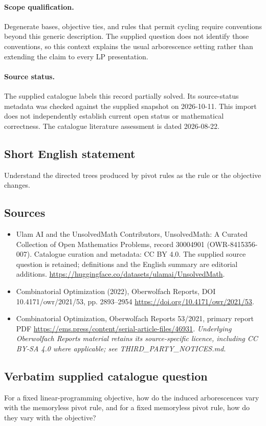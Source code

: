 \documentclass[11pt]{article}
\begin{document}
\paragraph{Scope qualification.}
Degenerate bases, objective ties, and rules that permit cycling require conventions beyond this generic description. The supplied question does not identify those conventions, so this context explains the usual arborescence setting rather than extending the claim to every LP presentation.
\paragraph{Source status.}
The supplied catalogue labels this record partially solved. Its source-status metadata was checked against the supplied snapshot on 2026-10-11. This import does not independently establish current open status or mathematical correctness. The catalogue literature assessment is dated 2026-08-22.
\subsection{Short English statement}
Understand the directed trees produced by pivot rules as the rule or the objective changes.
\subsection{Sources}
\begin{itemize}
\item[S1] Ulam AI and the UnsolvedMath Contributors, UnsolvedMath: A Curated Collection of Open Mathematics Problems, record 30004901 (OWR-8415356-007). Catalogue curation and metadata: CC BY 4.0. The supplied source question is retained; definitions and the English summary are editorial additions.
\url{https://huggingface.co/datasets/ulamai/UnsolvedMath}.
\item[S2] Combinatorial Optimization (2022), Oberwolfach Reports, DOI 10.4171/owr/2021/53, pp. 2893--2954
\url{https://doi.org/10.4171/owr/2021/53}.
\item[S3] Combinatorial Optimization, Oberwolfach Reports 53/2021, primary report PDF
\url{https://ems.press/content/serial-article-files/46931}.
\textit{Underlying Oberwolfach Reports material retains its source-specific licence, including CC BY-SA 4.0 where applicable; see THIRD\_PARTY\_NOTICES.md.}
\end{itemize}
\subsection{Verbatim supplied catalogue question}
For a fixed linear-programming objective, how do the induced arborescences vary with the memoryless pivot rule, and for a fixed memoryless pivot rule, how do they vary with the objective?
\end{document}
